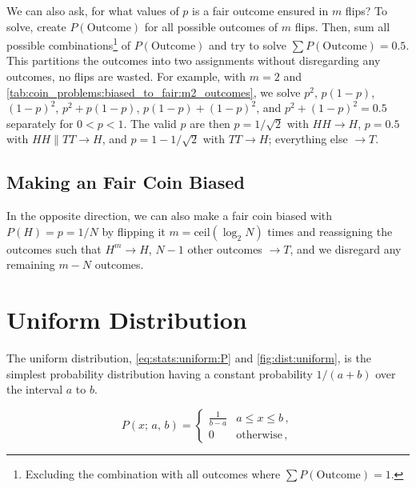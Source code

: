 We can also ask, for what values of $p$ is a fair outcome ensured in $m$ flips?
To solve, create $P\left(\text{Outcome}\right)$ for all possible outcomes of $m$ flips.
Then, sum all possible combinations\footnote{Excluding the combination with all outcomes where $\sum P\left(\text{Outcome}\right) = 1$.} of $P\left(\text{Outcome}\right)$
and try to solve $\sum P\left(\text{Outcome}\right) = \num{0.5}$.
This partitions the outcomes into two assignments without disregarding any outcomes, \ie no flips are wasted.
For example, with $m=2$ and \cref{tab:coin_problems:biased_to_fair:m2_outcomes}, we solve
$p^{2}$, $p\left(1-p\right)$, $\left(1-p\right)^{2}$,
$p^{2} + p\left(1-p\right)$, $p\left(1-p\right) + \left(1-p\right)^{2}$, and $p^{2} + \left(1-p\right)^{2} = \num{0.5}$
separately for $0<p<1$.
The valid $p$ are then
$p = 1/\sqrt{2}$ with $HH \to H$,
$p = \num{0.5}$ with $HH \parallel TT \to H$,
and $p = 1 - 1/\sqrt{2}$ with $TT \to H$;
everything else $\to T$.

\subsection{Making an Fair Coin Biased}
\label{stats:coin_problems:fair_to_biased}

In the opposite direction, we can also make a fair coin biased
with $P\left(H\right) = p = 1/N$ by flipping it
$m = \text{ceil}\left(\log_{2}N\right)$ times
and reassigning the outcomes such that $H^{m} \to H$,
$N-1$ other outcomes $\to T$, and we disregard any remaining $m-N$ outcomes.

\section{Uniform Distribution}
\label{stats:uniform}

The uniform distribution, \cref{eq:stats:uniform:P} and \cref{fig:dist:uniform},
is the simplest probability distribution
having a constant probability $1/(a+b)$ over the interval $a$ to $b$.

\begin{equation}\label{eq:stats:uniform:P}
P\left(x;\,a,\,b\right) = \begin{cases}
\frac{1}{b-a} & a \leq x \leq b \,, \\
0 & \text{otherwise} \,,
\end{cases}
\end{equation}

